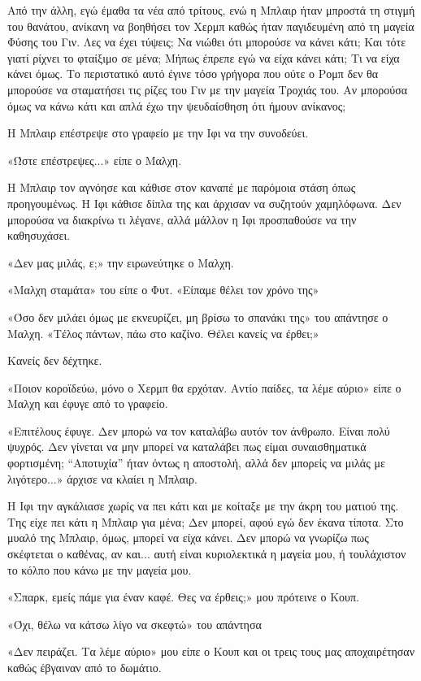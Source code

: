 \documentclass[12pt,twoside, openany]{book}
\begin{document}
Από την άλλη, εγώ έμαθα τα νέα από τρίτους, ενώ η Μπλαιρ ήταν μπροστά τη στιγμή του θανάτου, ανίκανη να βοηθήσει τον Χερμπ καθώς ήταν παγιδευμένη από τη μαγεία Φύσης του Γιν. Λες να έχει τύψεις; Να νιώθει ότι μπορούσε να κάνει κάτι; Και τότε γιατί ρίχνει το φταίξιμο σε μένα; Μήπως έπρεπε εγώ να είχα κάνει κάτι; Τι να είχα κάνει όμως. Το περιστατικό αυτό έγινε τόσο γρήγορα που ούτε ο Ρομπ δεν θα μπορούσε να σταματήσει τις ρίζες του Γιν με την μαγεία Τροχιάς του. Αν μπορούσα όμως να κάνω κάτι και απλά έχω την ψευδαίσθηση ότι ήμουν ανίκανος;

Η Μπλαιρ επέστρεψε στο γραφείο με την Ιφι να την συνοδεύει.

«Ώστε επέστρεψες...» είπε ο Μαλχη.

Η Μπλαιρ τον αγνόησε και κάθισε στον καναπέ με παρόμοια στάση όπως προηγουμένως. Η Ιφι κάθισε δίπλα της και άρχισαν να συζητούν χαμηλόφωνα. Δεν μπορούσα να διακρίνω τι λέγανε, αλλά μάλλον η Ιφι προσπαθούσε να την καθησυχάσει.

«Δεν μας μιλάς, ε;» την ειρωνεύτηκε ο Μαλχη.

«Μαλχη σταμάτα» του είπε ο Φυτ. «Είπαμε θέλει τον χρόνο της»

«Όσο δεν μιλάει όμως με εκνευρίζει, μη βρίσω το σπανάκι της» του απάντησε ο Μαλχη. «Τέλος πάντων, πάω στο καζίνο. Θέλει κανείς να έρθει;»

Κανείς δεν δέχτηκε.

«Ποιον κοροϊδεύω, μόνο ο Χερμπ θα ερχόταν. Αντίο παίδες, τα λέμε αύριο» είπε ο Μαλχη και έφυγε από το γραφείο.

«Επιτέλους έφυγε. Δεν μπορώ να τον καταλάβω αυτόν τον άνθρωπο. Είναι πολύ ψυχρός. Δεν γίνεται να μην μπορεί να καταλάβει πως είμαι συναισθηματικά φορτισμένη; “Αποτυχία” ήταν όντως η αποστολή, αλλά δεν μπορείς να μιλάς με λιγότερο...» άρχισε να κλαίει η Μπλαιρ.

Η Ιφι την αγκάλιασε χωρίς να πει κάτι και με κοίταξε με την άκρη του ματιού της. Της είχε πει κάτι η Μπλαιρ για μένα; Δεν μπορεί, αφού εγώ δεν έκανα τίποτα. Στο μυαλό της Μπλαιρ, όμως, μπορεί να είχα κάνει. Δεν μπορώ να γνωρίζω πως σκέφτεται ο καθένας, αν και... αυτή είναι κυριολεκτικά η μαγεία μου, ή τουλάχιστον το κόλπο που κάνω με την μαγεία μου.

«Σπαρκ, εμείς πάμε για έναν καφέ. Θες να έρθεις;» μου πρότεινε ο Κουπ.

«Όχι, θέλω να κάτσω λίγο να σκεφτώ» του απάντησα

«Δεν πειράζει. Τα λέμε αύριο» μου είπε ο Κουπ και οι τρεις τους μας αποχαιρέτησαν καθώς έβγαιναν από το δωμάτιο.
\end{document}
